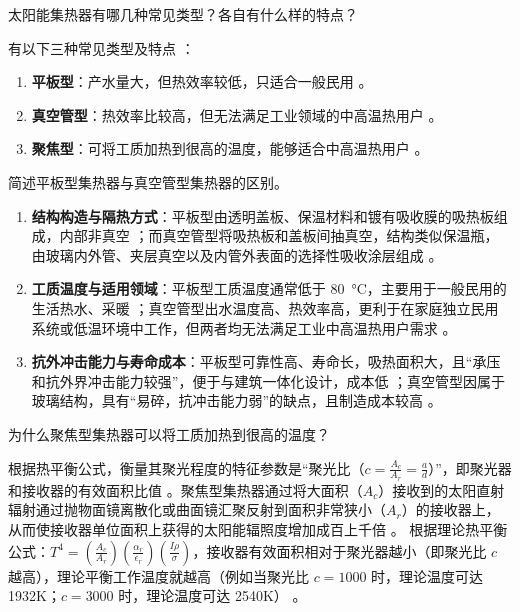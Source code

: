 \begin{problem}\label{exer:think_04_solar_04}
太阳能集热器有哪几种常见类型？各自有什么样的特点？
\end{problem}

\begin{solution}
有以下三种常见类型及特点 ：
\begin{enumerate}
\item \textbf{平板型}：产水量大，但热效率较低，只适合一般民用 。
\item \textbf{真空管型}：热效率比较高，但无法满足工业领域的中高温热用户 。
\item \textbf{聚焦型}：可将工质加热到很高的温度，能够适合中高温热用户 。
\end{enumerate}
\end{solution}

\begin{problem}\label{exer:think_04_solar_05}
简述平板型集热器与真空管型集热器的区别。
\end{problem}

\begin{solution}
\begin{enumerate}
\item \textbf{结构构造与隔热方式}：平板型由透明盖板、保温材料和镀有吸收膜的吸热板组成，内部非真空 ；而真空管型将吸热板和盖板间抽真空，结构类似保温瓶，由玻璃内外管、夹层真空以及内管外表面的选择性吸收涂层组成 。
\item \textbf{工质温度与适用领域}：平板型工质温度通常低于 \qty{80}{\degreeCelsius}，主要用于一般民用的生活热水、采暖 ；真空管型出水温度高、热效率高，更利于在家庭独立民用系统或低温环境中工作，但两者均无法满足工业中高温热用户需求 。
\item \textbf{抗外冲击能力与寿命成本}：平板型可靠性高、寿命长，吸热面积大，且“承压和抗外界冲击能力较强”，便于与建筑一体化设计，成本低 ；真空管型因属于玻璃结构，具有“易碎，抗冲击能力弱”的缺点，且制造成本较高 。
\end{enumerate}
\end{solution}

\begin{problem}\label{exer:think_04_solar_06}
为什么聚焦型集热器可以将工质加热到很高的温度？
\end{problem}

\begin{solution}
根据热平衡公式，衡量其聚光程度的特征参数是“聚光比（\(c=\frac{A_c}{A_r}=\frac{a}{d}\)）”，即聚光器和接收器的有效面积比值 。聚焦型集热器通过将大面积（\(A_c\)）接收到的太阳直射辐射通过抛物面镜离散化或曲面镜汇聚反射到面积非常狭小（\(A_r\)）的接收器上，从而使接收器单位面积上获得的太阳能辐照度增加成百上千倍 。 根据理论热平衡公式：\(T^4=(\frac{A_c}{A_r})(\frac{\alpha_r}{\epsilon_r})(\frac{I\rho}{\sigma})\)，接收器有效面积相对于聚光器越小（即聚光比 \(c\) 越高），理论平衡工作温度就越高（例如当聚光比 \(c=1000\) 时，理论温度可达 1932K；\(c=3000\) 时，理论温度可达 2540K） 。
\end{solution}

